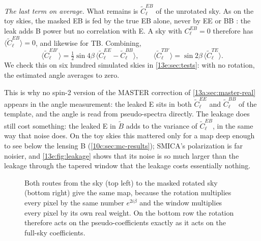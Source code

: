 \emph{The last term on average.} What remains is $\widetilde C^{EB}_\ell$ of the unrotated sky. As on the toy
skies, the masked EB is fed by the true EB alone, never by EE or BB \cite{Alonso2019}: the leak adds B power but
no correlation with E. A sky with $C^{EB}_\ell=0$ therefore has $\langle\widetilde C^{EB}_\ell\rangle=0$, and
likewise for TB. Combining,
\begin{equation}
  \bigl\langle\widetilde C^{EB\prime}_\ell\bigr\rangle=\tfrac12\sin4\beta\,
  \bigl\langle\widetilde C^{EE}_\ell-\widetilde C^{BB}_\ell\bigr\rangle,\qquad
  \bigl\langle\widetilde C^{TB\prime}_\ell\bigr\rangle=\sin2\beta\,\bigl\langle\widetilde C^{TE}_\ell\bigr\rangle .
  \label{13e:eq:pseudo-mean}
\end{equation}
We check this on six hundred simulated skies in \cref{13e:sec:tests}: with no rotation, the estimated angle
averages to zero.

This is why no spin-2 version of the MASTER correction of \cref{13a:sec:master-real} appears in the angle
measurement: the leaked E sits in both $\widetilde C^{EE}_\ell$ and $\widetilde C^{BB}_\ell$ of the template, and the
angle is read from pseudo-spectra directly. The leakage does still cost something: the leaked E in
$\widetilde B$ adds to the variance of $\widetilde C^{EB}_\ell$, in the same way that noise does. On the toy skies
this mattered only for a map deep enough to see below the lensing B (\cref{10c:sec:mc-results}); SMICA's
polarization is far noisier, and \cref{13e:fig:leakage} shows that its noise is so much larger than the
leakage through the tapered window that the leakage costs essentially nothing.

\begin{figure}[htbp]
\centering
{}
\caption{Both routes from the sky (top left) to the masked rotated sky (bottom right) give the same map,
because the rotation multiplies every pixel by the same number $e^{2i\beta}$ and the window multiplies every
pixel by its own real weight. On the bottom row the rotation therefore acts on the pseudo-coefficients
exactly as it acts on the full-sky coefficients.}
\label{13e:fig:commute}
\end{figure}

